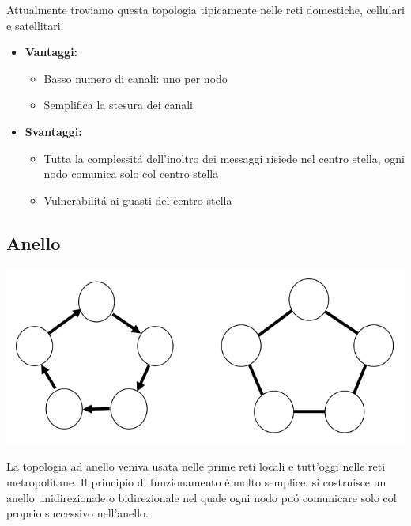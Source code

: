 \documentclass[12pt]{article}
\begin{document}
Attualmente troviamo questa topologia tipicamente nelle reti domestiche, cellulari e satellitari.
\begin{itemize}[noitemsep]
	\item \textbf{Vantaggi:}
	\begin{itemize}[noitemsep]
		\item Basso numero di canali: uno per nodo
		\item Semplifica la stesura dei canali
	\end{itemize}
	\item \textbf{Svantaggi:}
	\begin{itemize}[noitemsep]
		\item Tutta la complessit\'a dell'inoltro dei messaggi risiede nel centro stella, ogni nodo comunica solo col centro
		      stella
		\item Vulnerabilit\'a ai guasti del centro stella
	\end{itemize}
\end{itemize}

\subsection{Anello}\label{anello}
\begin{center}
	\includegraphics[scale=0.36]{introduzione-img8.png}
\end{center}
La topologia ad anello veniva usata nelle prime reti locali e tutt'oggi nelle reti metropolitane. Il principio di 
funzionamento \'e molto semplice: si costruisce un anello unidirezionale o bidirezionale nel quale ogni nodo pu\'o 
comunicare solo col proprio successivo nell'anello.
\end{document}
